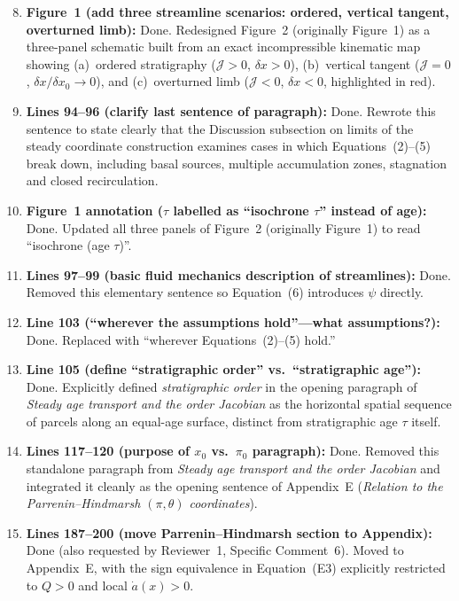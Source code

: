 \documentclass[11pt]{article}
\begin{document}
\begin{enumerate}\setcounter{enumi}{7}
  \item \textbf{Figure~1 (add three streamline scenarios: ordered, vertical tangent, overturned limb):} \textcolor{responseblue}{Done. Redesigned Figure~2 (originally Figure~1) as a three-panel schematic built from an exact incompressible kinematic map showing (a)~ordered stratigraphy (\(\mathcal{J}>0\), \(\delta x>0\)), (b)~vertical tangent (\(\mathcal{J}=0\), \(\delta x/\delta x_0\to 0\)), and (c)~overturned limb (\(\mathcal{J}<0\), \(\delta x<0\), highlighted in red).}
  \item \textbf{Lines 94--96 (clarify last sentence of paragraph):} \textcolor{responseblue}{Done. Rewrote this sentence to state clearly that the Discussion subsection on limits of the steady coordinate construction examines cases in which Equations~(2)--(5) break down, including basal sources, multiple accumulation zones, stagnation and closed recirculation.}
  \item \textbf{Figure~1 annotation (\(\tau\) labelled as ``isochrone \(\tau\)'' instead of age):} \textcolor{responseblue}{Done. Updated all three panels of Figure~2 (originally Figure~1) to read ``isochrone (age \(\tau\))''.}
  \item \textbf{Lines 97--99 (basic fluid mechanics description of streamlines):} \textcolor{responseblue}{Done. Removed this elementary sentence so Equation~(6) introduces \(\psi\) directly.}
  \item \textbf{Line 103 (``wherever the assumptions hold''---what assumptions?):} \textcolor{responseblue}{Done. Replaced with ``wherever Equations~(2)--(5) hold.''}
  \item \textbf{Line 105 (define ``stratigraphic order'' vs.\ ``stratigraphic age''):} \textcolor{responseblue}{Done. Explicitly defined \emph{stratigraphic order} in the opening paragraph of \emph{Steady age transport and the order Jacobian} as the horizontal spatial sequence of parcels along an equal-age surface, distinct from stratigraphic age \(\tau\) itself.}
  \item \textbf{Lines 117--120 (purpose of \(x_0\) vs.\ \(\pi_0\) paragraph):} \textcolor{responseblue}{Done. Removed this standalone paragraph from \emph{Steady age transport and the order Jacobian} and integrated it cleanly as the opening sentence of Appendix~E (\emph{Relation to the Parrenin--Hindmarsh \((\pi,\theta)\) coordinates}).}
  \item \textbf{Lines 187--200 (move Parrenin--Hindmarsh section to Appendix):} \textcolor{responseblue}{Done (also requested by Reviewer~1, Specific Comment~6). Moved to Appendix~E, with the sign equivalence in Equation~(E3) explicitly restricted to \(Q>0\) and local \(\dot a(x)>0\).}

\end{enumerate}
\end{document}
